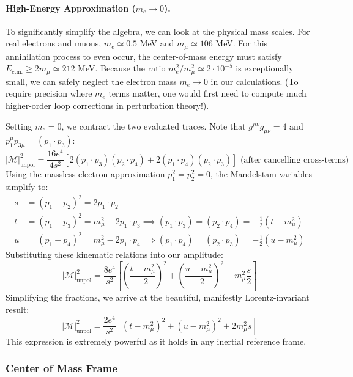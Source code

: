 \paragraph{High-Energy Approximation ($m_e \to 0$).}
To significantly simplify the algebra, we can look at the physical mass scales. For real electrons and muons, $m_e \simeq 0.5$ MeV and $m_\mu \simeq 106$ MeV. For this annihilation process to even occur, the center-of-mass energy must satisfy $E_{\text{c.m.}} \geq 2m_\mu \simeq 212$ MeV.
Because the ratio $m_e^2 / m_\mu^2 \simeq 2 \cdot 10^{-5}$ is exceptionally small, we can safely neglect the electron mass $m_e \to 0$ in our calculations. (To require precision where $m_e$ terms matter, one would first need to compute much higher-order loop corrections in perturbation theory!).

Setting $m_e = 0$, we contract the two evaluated traces. Note that $g^{\mu\nu} g_{\mu\nu} = 4$ and $p_1^\mu p_{3\mu} = (p_1 \cdot p_3)$:
\[
    \vert \mathcal{M} \vert_{\text{unpol}}^2 = \frac{16 e^4}{4 s^2} \left[ 2(p_1 \cdot p_3)(p_2 \cdot p_4) + 2(p_1 \cdot p_4)(p_2 \cdot p_3) \right] \text{ (after cancelling cross-terms)}
\]
Using the massless electron approximation $p_1^2 = p_2^2 = 0$, the Mandelstam variables simplify to:
\begin{align*}
    s & = (p_1 + p_2)^2 = 2p_1 \cdot p_2                                                                                  \\
    t & = (p_1 - p_3)^2 = m_\mu^2 - 2p_1 \cdot p_3 \implies (p_1 \cdot p_3) = (p_2 \cdot p_4) = -\frac{1}{2}(t - m_\mu^2) \\
    u & = (p_1 - p_4)^2 = m_\mu^2 - 2p_1 \cdot p_4 \implies (p_1 \cdot p_4) = (p_2 \cdot p_3) = -\frac{1}{2}(u - m_\mu^2)
\end{align*}
Substituting these kinematic relations into our amplitude:
\[
    \vert \mathcal{M} \vert_{\text{unpol}}^2 = \frac{8 e^4}{s^2} \left[ \left(\frac{t - m_\mu^2}{-2}\right)^2 + \left(\frac{u - m_\mu^2}{-2}\right)^2 + m_\mu^2 \frac{s}{2} \right]
\]
Simplifying the fractions, we arrive at the beautiful, manifestly Lorentz-invariant result:
\[
    \vert \mathcal{M} \vert_{\text{unpol}}^2 = \frac{2 e^4}{s^2} \left[ (t - m_\mu^2)^2 + (u - m_\mu^2)^2 + 2m_\mu^2 s \right]
\]
This expression is extremely powerful as it holds in any inertial reference frame.

\subsubsection{Center of Mass Frame}

